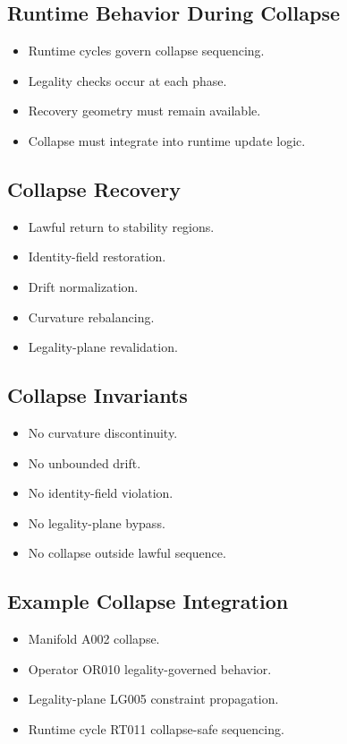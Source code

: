 \subsection{Runtime Behavior During Collapse}
\begin{itemize}
    \item Runtime cycles govern collapse sequencing.
    \item Legality checks occur at each phase.
    \item Recovery geometry must remain available.
    \item Collapse must integrate into runtime update logic.
\end{itemize}

\subsection{Collapse Recovery}
\begin{itemize}
    \item Lawful return to stability regions.
    \item Identity-field restoration.
    \item Drift normalization.
    \item Curvature rebalancing.
    \item Legality-plane revalidation.
\end{itemize}

\subsection{Collapse Invariants}
\begin{itemize}
    \item No curvature discontinuity.
    \item No unbounded drift.
    \item No identity-field violation.
    \item No legality-plane bypass.
    \item No collapse outside lawful sequence.
\end{itemize}

\subsection{Example Collapse Integration}
\begin{itemize}
    \item Manifold A002 collapse.
    \item Operator OR010 legality-governed behavior.
    \item Legality-plane LG005 constraint propagation.
    \item Runtime cycle RT011 collapse-safe sequencing.
\end{itemize}
